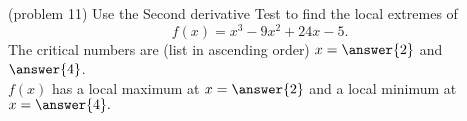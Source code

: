 \documentclass{ximera}
\begin{document}
\begin{problem}(problem 11)
Use the Second derivative Test to find the local extremes of
\[
f(x) = x^3 - 9x^2 + 24x - 5.
\]
The critical numbers are (list in ascending order) $x= \answer{2}$ and $\answer{4}$.\\
$f(x)$ has a local maximum at $x = \answer{2}$ and a local minimum at $x = \answer{4}.$
\end{problem}
\end{document}
